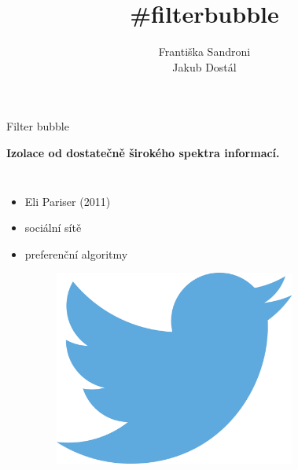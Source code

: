 \documentclass[notheorems,12pt]{beamer}
\title[]{\#filterbubble}
\date{}
\author{Františka Sandroni\\
        Jakub Dostál}
\institute{}
\begin{document}
\maketitle
\begin{frame}{Filter bubble}
    \center
    \vspace{-0.1cm}
    \begin{large}\textbf{Izolace od dostatečně širokého spektra informací.}\end{large}
    \vspace{0.7cm}
    \begin{columns}
    \column{5cm}
    \begin{itemize}
        \item Eli Pariser (2011)
        \item sociální sítě
        \item preferenční algoritmy
        \vspace{0.1cm}
        \begin{figure}
            \includegraphics[scale=0.4]{./Pics/twitter.png}
        \end{figure}
    \end{itemize}
    \column{6cm}
        \begin{figure}
            \centering

\end{figure}
\end{columns}
\end{frame}
\end{document}
